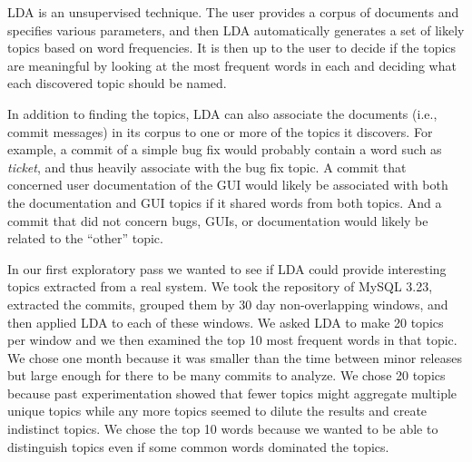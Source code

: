 \documentclass[times, 10pt,twocolumn]{article}
\newcommand{\shrinkit}{\vspace*{-.3em}}
\begin{document}
LDA is an unsupervised technique.  The user provides a corpus of
documents and specifies various parameters, and then LDA automatically
generates a set of likely topics based on word frequencies.  It is
then up to the user to decide if the topics are meaningful by looking
at the most frequent words in each and deciding what each discovered
topic should be named.

In addition to finding the topics, LDA can also associate the
documents (i.e., commit messages) in its corpus to one or more of the
topics it discovers.  For example, a commit of a simple bug fix would
probably contain a word such as \emph{ticket}, and thus heavily associate
with the bug fix topic.  A commit that concerned user documentation of
the GUI would likely be associated with both the documentation and GUI
topics if it shared words from both topics.  And a commit that did not
concern bugs, GUIs, or documentation would likely be related to the ``other'' topic.









\shrinkit
{}
\shrinkit

In our first exploratory pass we wanted to see if LDA could provide
interesting topics extracted from a real system. We took the
repository of MySQL 3.23, extracted the commits, grouped them by 30
day non-overlapping windows, and then applied LDA to each of these
windows. We asked LDA to make 20 topics per window and we then
examined the top 10 most frequent words in that topic.  We chose one
month because it was smaller than the time between minor releases but
large enough for there to be many commits to analyze. We chose 20
topics because past experimentation showed that fewer topics might
aggregate multiple unique topics while any more topics seemed to dilute
the results and create indistinct topics. 
We chose the top 10 words because we wanted to be able to distinguish
topics even if some common words dominated the topics.



\end{document}
